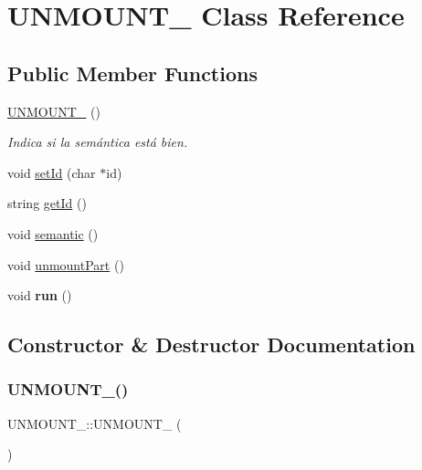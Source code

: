 \hypertarget{classUNMOUNT__}{}\section{U\+N\+M\+O\+U\+N\+T\+\_\+ Class Reference}
\label{classUNMOUNT__}
\subsection*{Public Member Functions}
\begin{DoxyCompactItemize}
\item 
\hyperlink{classUNMOUNT___a4a84a97d0ac63eca871e38e9d7fa5997}{U\+N\+M\+O\+U\+N\+T\+\_\+} ()
\begin{DoxyCompactList}\small\item\em Indica si la semántica está bien. \end{DoxyCompactList}\item 
void \hyperlink{classUNMOUNT___a0cd96a661b50f63f616b717147194938}{set\+Id} (char $\ast$id)
\item 
string \hyperlink{classUNMOUNT___a5e5019d6ab84211500faf26b95de37c0}{get\+Id} ()
\item 
void \hyperlink{classUNMOUNT___a3fbcb5cc9a934c58f8feaebad15ad4db}{semantic} ()
\item 
void \hyperlink{classUNMOUNT___a23cf126236a050b9254fa2a076e051a4}{unmount\+Part} ()
\item 
\mbox{\label{classUNMOUNT___a6c9191ccd432a6f8aa1ba6073f4c6cdf}} 
void {\bfseries run} ()
\end{DoxyCompactItemize}


\subsection{Constructor \& Destructor Documentation}
\mbox{\label{classUNMOUNT___a4a84a97d0ac63eca871e38e9d7fa5997}} 
\subsubsection{\texorpdfstring{U\+N\+M\+O\+U\+N\+T\+\_\+()}{UNMOUNT\_()}}
{\footnotesize\ttfamily U\+N\+M\+O\+U\+N\+T\+\_\+\+::\+U\+N\+M\+O\+U\+N\+T\+\_\+ (\begin{DoxyParamCaption}{ }\end{DoxyParamCaption})\hspace{0.3cm}{\ttfamily [inline]}}



